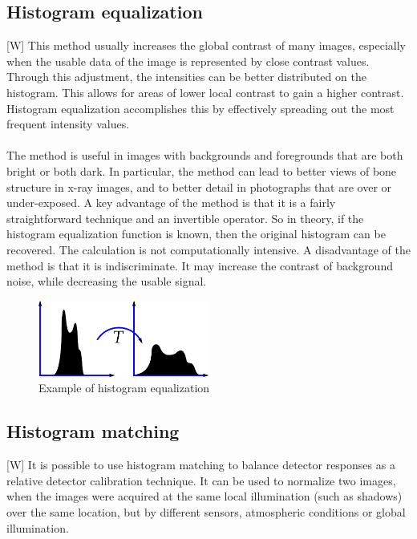 \documentclass[12pt]{article}
\begin{document}
	\subsection{Histogram equalization}
	[W] This method usually increases the global contrast of many images, especially when the usable data
	 of the image is represented by close contrast values. Through this adjustment, the intensities 
	 can be better distributed on the histogram. This allows for areas of lower local contrast to gain 
	 a higher contrast. Histogram equalization accomplishes this by effectively spreading out the most 
	 frequent intensity values.\\
	 \\
	The method is useful in images with backgrounds and foregrounds that are both bright or both dark. 
	In particular, the method can lead to better views of bone structure in x-ray images, and to 
	better detail in photographs that are over or under-exposed. A key advantage of the method is that 
	it is a fairly straightforward technique and an invertible operator. So in theory, if the 
	histogram equalization function is known, then the original histogram can be recovered. The 
	calculation is not computationally intensive. A disadvantage of the method is that it is 
	indiscriminate. It may increase the contrast of background noise, while decreasing the usable 
	signal.
	\begin{figure}[h!]
		\centering
		\includegraphics[width=0.5\textwidth]{img/histogram_equalization.png}
		\caption{Example of histogram equalization}		
		\label{fig:histeq}
	\end{figure}
	
	\subsection{Histogram matching}
	[W] It is possible to use histogram matching to balance detector responses as a relative detector 
	calibration technique. It can be used to normalize two images, when the images were acquired at 
	the same local illumination (such as shadows) over the same location, but by different sensors, 
	atmospheric conditions or global illumination.
%	
%	
\end{document}
